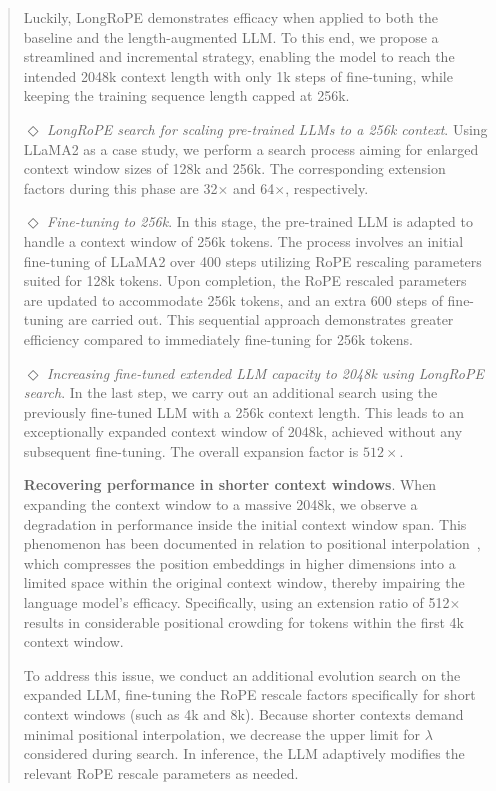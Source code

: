 \begin{abstract}
Luckily, LongRoPE demonstrates efficacy when applied to both the baseline and the length-augmented LLM. To this end, we propose a streamlined and incremental strategy, enabling the model to reach the intended 2048k context length with only 1k steps of fine-tuning, while keeping the training sequence length capped at 256k.

$\Diamond$ \textit{LongRoPE search for scaling pre-trained LLMs to a 256k context}. Using LLaMA2 as a case study, we perform a search process aiming for enlarged context window sizes of 128k and 256k. The corresponding extension factors during this phase are 32$\times$ and 64$\times$, respectively.

$\Diamond$ \textit{Fine-tuning to 256k}. In this stage, the pre-trained LLM is adapted to handle a context window of 256k tokens. The process involves an initial fine-tuning of LLaMA2 over 400 steps utilizing RoPE rescaling parameters suited for 128k tokens. Upon completion, the RoPE rescaled parameters are updated to accommodate 256k tokens, and an extra 600 steps of fine-tuning are carried out. This sequential approach demonstrates greater efficiency compared to immediately fine-tuning for 256k tokens.

$\Diamond$ \textit{Increasing fine-tuned extended LLM capacity to 2048k using LongRoPE search}. In the last step, we carry out an additional search using the previously fine-tuned LLM with a 256k context length. This leads to an exceptionally expanded context window of 2048k, achieved without any subsequent fine-tuning. The overall expansion factor is $512\times$.

\textbf{Recovering performance in shorter context windows}. When expanding the context window to a massive 2048k, we observe a degradation in performance inside the initial context window span. This phenomenon has been documented in relation to positional interpolation~\cite{pi}, which compresses the position embeddings in higher dimensions into a limited space within the original context window, thereby impairing the language model’s efficacy. Specifically, using an extension ratio of 512$\times$ results in considerable positional crowding for tokens within the first 4k context window.

To address this issue, we conduct an additional evolution search on the expanded LLM, fine-tuning the RoPE rescale factors specifically for short context windows (such as 4k and 8k). Because shorter contexts demand minimal positional interpolation, we decrease the upper limit for $\lambda$ considered during search. In inference, the LLM adaptively modifies the relevant RoPE rescale parameters as needed.


\end{abstract}
